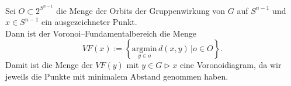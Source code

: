 \begin{definition}\label{fundamentalbereich:voronoi} \mbox{}\\
   Sei $O \subset 2^{S^{n-1}}$ die Menge der Orbits der Gruppenwirkung von $G$ auf $S^{n-1}$ und $x \in S^{n-1}$ ein ausgezeichneter Punkt.\\

   Dann ist der Voronoi--Fundamentalbereich die Menge
   $$
      VF(x) := \left\{ \underset{y\in o}{\text{argmin}} \, d(x,y) \, |  o \in O\right\}.
   $$
   Damit ist die Menge der $VF(y)$ mit $y \in G \rhd x$ eine Voronoidiagram, da wir jeweils die Punkte mit minimalem Abstand genommen haben.
\end{definition}


